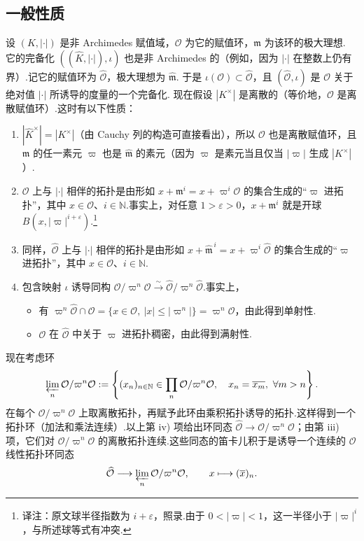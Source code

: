 \subsection{一般性质}\label{sec:nt-4-2-1}
设 $(K,|\cdot|)$ 是非 Archimedes 赋值域，$\mathcal O$ 为它的赋值环，$\mathfrak m$ 为该环的极大理想.
它的完备化 $((\widehat K,|\cdot|),\iota)$ 也是非 Archimedes 的（例如，因为 $|\cdot|$ 在整数上仍有界）.记它的赋值环为 $\widehat{\mathcal O}$，极大理想为 $\widehat{\mathfrak m}$.
于是 $\iota(\mathcal O)\subset\widehat{\mathcal O}$，且 $(\widehat{\mathcal O},\iota)$ 是 $\mathcal O$ 关于绝对值 $|\cdot|$ 所诱导的度量的一个完备化.
现在假设 $|K^\times|$ 是离散的（等价地，$\mathcal O$ 是离散赋值环）.这时有以下性质：
\begin{enumerate}[label=\roman*)]
\item $|\widehat K^\times|=|K^\times|$（由 Cauchy 列的构造可直接看出），所以 $\widehat{\mathcal O}$ 也是离散赋值环，且 $\mathfrak m$ 的任一素元 $\varpi$ 也是 $\widehat{\mathfrak m}$ 的素元（因为 $\varpi$ 是素元当且仅当 $|\varpi|$ 生成 $|K^\times|$）.
\item $\mathcal O$ 上与 $|\cdot|$ 相伴的拓扑是由形如 $x+\mathfrak m^i=x+\varpi^i\mathcal O$ 的集合生成的``$\varpi$ 进拓扑''，其中 $x\in\mathcal O$、$i\in\mathbb N$.事实上，对任意 $1>\varepsilon>0$，$x+\mathfrak m^i$ 就是开球 $B(x,|\varpi|^{i+\varepsilon})$.\footnote{译注：原文球半径指数为 $i+\varepsilon$，照录.由于 $0<|\varpi|<1$，这一半径小于 $|\varpi|^i$，与所述球等式有冲突.}
\item 同样，$\widehat{\mathcal O}$ 上与 $|\cdot|$ 相伴的拓扑是由形如 $x+\widehat{\mathfrak m}^{\,i}=x+\varpi^i\widehat{\mathcal O}$ 的集合生成的``$\varpi$ 进拓扑''，其中 $x\in\mathcal O$、$i\in\mathbb N$.
\item 包含映射 $\iota$ 诱导同构 $\mathcal O/\varpi^n\mathcal O\xrightarrow{\sim}\widehat{\mathcal O}/\varpi^n\widehat{\mathcal O}$.事实上，
\begin{itemize}
\item 有 $\varpi^n\widehat{\mathcal O}\cap\mathcal O=\{x\in\mathcal O,\ |x|\le|\varpi^n|\}=\varpi^n\mathcal O$，由此得到单射性.
\item $\mathcal O$ 在 $\widehat{\mathcal O}$ 中关于 $\varpi$ 进拓扑稠密，由此得到满射性.
\end{itemize}
\end{enumerate}
现在考虑环
\begin{align*}
\varprojlim_n\mathcal O/\varpi^n\mathcal O
:=\left\{(x_n)_{n\in\mathbb N}\in\prod_n\mathcal O/\varpi^n\mathcal O,\quad x_n=\overline{x_m},\ \forall m>n\right\}.
\end{align*}
在每个 $\mathcal O/\varpi^n\mathcal O$ 上取离散拓扑，再赋予此环由乘积拓扑诱导的拓扑.这样得到一个拓扑环（加法和乘法连续）.以上第 iv) 项给出环同态 $\widehat{\mathcal O}\longrightarrow\mathcal O/\varpi^n\mathcal O$；由第 iii) 项，它们对 $\mathcal O/\varpi^n\mathcal O$ 的离散拓扑连续.这些同态的笛卡儿积于是诱导一个连续的 $\mathcal O$ 线性拓扑环同态
\begin{align*}
\widehat{\mathcal O}\longrightarrow\varprojlim_n\mathcal O/\varpi^n\mathcal O,
\qquad x\longmapsto(\overline x)_n.
\end{align*}
